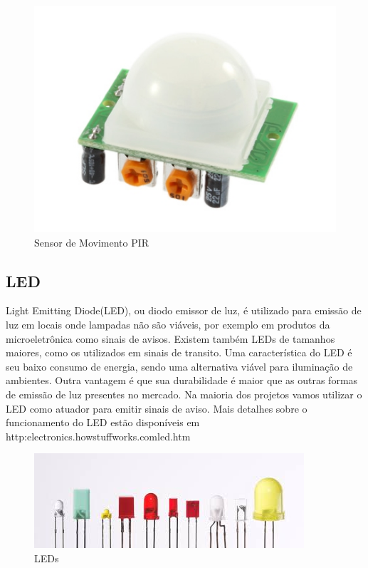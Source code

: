\begin{figure}[ht]
      \centering
      \includegraphics[scale=1.20]{figuras/Fpir.png}
      \caption{Sensor de Movimento PIR}
      \label{fig:SPIR}
\end{figure}



\subsection{LED}

Light Emitting Diode(LED), ou diodo emissor de luz, é utilizado para emissão de luz em locais onde lampadas não são viáveis, por exemplo em produtos da microeletrônica como sinais de avisos. Existem também LEDs de tamanhos maiores, como os utilizados em sinais de transito. Uma característica do LED é seu baixo consumo de energia, sendo uma alternativa viável para iluminação de ambientes. Outra vantagem é que sua durabilidade é maior que as outras formas de emissão de luz presentes no mercado. Na maioria dos projetos vamos utilizar o LED como atuador para emitir sinais de aviso. Mais detalhes sobre o funcionamento do LED estão disponíveis em http:\/\/electronics.howstuffworks.com\/led.htm


\begin{figure}[ht]
      \centering
      \includegraphics[scale=0.50]{figuras/Fled.jpg}
      \caption{LEDs}
      \label{fig:Aled}
\end{figure}


